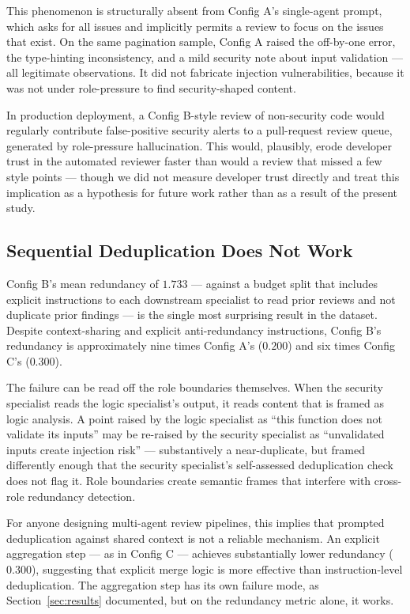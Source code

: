 \documentclass[pdflatex,sn-mathphys-num]{sn-jnl}
\theoremstyle{thmstyleone}
\theoremstyle{thmstyletwo}
\theoremstyle{thmstylethree}
\begin{document}
This phenomenon is structurally absent from Config A's single-agent prompt, which asks for all issues and implicitly permits a review to focus on the issues that exist. On the same pagination sample, Config A raised the off-by-one error, the type-hinting inconsistency, and a mild security note about input validation --- all legitimate observations. It did not fabricate injection vulnerabilities, because it was not under role-pressure to find security-shaped content.

In production deployment, a Config B-style review of non-security code would regularly contribute false-positive security alerts to a pull-request review queue, generated by role-pressure hallucination. This would, plausibly, erode developer trust in the automated reviewer faster than would a review that missed a few style points --- though we did not measure developer trust directly and treat this implication as a hypothesis for future work rather than as a result of the present study.

\subsection{Sequential Deduplication Does Not Work}

Config B's mean redundancy of $1.733$ --- against a budget split that includes explicit instructions to each downstream specialist to read prior reviews and not duplicate prior findings --- is the single most surprising result in the dataset. Despite context-sharing and explicit anti-redundancy instructions, Config B's redundancy is approximately nine times Config A's ($0.200$) and six times Config C's ($0.300$).

The failure can be read off the role boundaries themselves. When the security specialist reads the logic specialist's output, it reads content that is framed as logic analysis. A point raised by the logic specialist as ``this function does not validate its inputs'' may be re-raised by the security specialist as ``unvalidated inputs create injection risk'' --- substantively a near-duplicate, but framed differently enough that the security specialist's self-assessed deduplication check does not flag it. Role boundaries create semantic frames that interfere with cross-role redundancy detection.

For anyone designing multi-agent review pipelines, this implies that prompted deduplication against shared context is not a reliable mechanism. An explicit aggregation step --- as in Config C --- achieves substantially lower redundancy ($0.300$), suggesting that explicit merge logic is more effective than instruction-level deduplication. The aggregation step has its own failure mode, as Section~\ref{sec:results} documented, but on the redundancy metric alone, it works.
\end{document}
